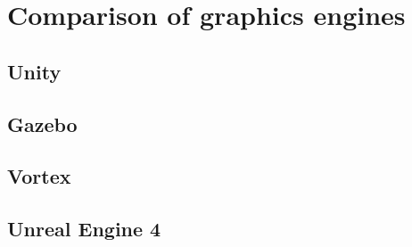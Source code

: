 
\chapter{Comparison of graphics engines}

\section{Unity}

\section{Gazebo}

\section{Vortex}

\section{Unreal Engine 4}

\cleardoublepage